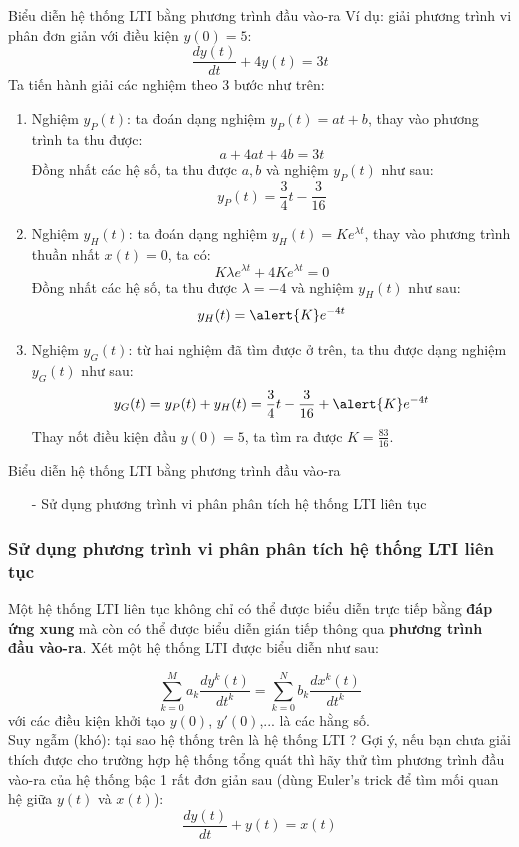 \documentclass[8pt]{beamer}
\begin{document}
\begin{frame}{Biểu diễn hệ thống LTI bằng phương trình đầu vào-ra}
Ví dụ: giải phương trình vi phân đơn giản với điều kiện $y(0)=5$:
$$\frac{dy(t)}{dt}+4y(t)=3t$$
Ta tiến hành giải các nghiệm theo 3 bước như trên:
\begin{enumerate}
	\item Nghiệm $y_{P}(t)$: ta đoán dạng nghiệm $y_{P}(t)=at+b$, thay vào phương trình ta thu được: $$a+4at+4b=3t$$
Đồng nhất các hệ số, ta thu được $a,b$ và nghiệm $y_{P}(t)$ như sau:
$$y_{P}(t)=\frac{3}{4}t-\frac{3}{16}$$
\item Nghiệm $y_{H}(t)$: ta đoán dạng nghiệm $y_{H}(t)=Ke^{\lambda t}$, thay vào phương trình thuần nhất $x(t)=0$, ta có:
	$$K\lambda e^{\lambda t}+4K e^{\lambda t}=0$$
Đồng nhất các hệ số, ta thu được $\lambda=-4$ và nghiệm $y_{H}(t)$ như sau:
$$y_{H}(t)=\alert{K}e^{-4t}$$
\item Nghiệm $y_{G}(t)$: từ hai nghiệm đã tìm được ở trên, ta thu được dạng nghiệm $y_{G}(t)$ như sau:
	$$y_{G}(t)=y_{P}(t)+y_{H}(t)=\frac{3}{4}t-\frac{3}{16}+\alert{K}e^{-4t}$$
	Thay nốt điều kiện đầu $y(0)=5$, ta tìm ra được $K=\frac{83}{16}$. 
\end{enumerate}
\end{frame}
\begin{frame}{Biểu diễn hệ thống LTI bằng phương trình đầu vào-ra}
\begin{itemize}
	\item[-] Sử dụng phương trình vi phân phân tích hệ thống LTI liên tục  
\end{itemize}
\subsubsection{Sử dụng phương trình vi phân phân tích hệ thống LTI liên tục}

Một hệ thống LTI liên tục không chỉ có thể được biểu diễn trực tiếp bằng \textbf{đáp ứng xung} mà còn có thể được biểu diễn gián tiếp thông qua \textbf{phương trình đầu vào-ra}. Xét một hệ thống LTI được biểu diễn như sau:

$$\sum_{k=0}^{M}a_{k}\frac{dy^k(t)}{dt^k}=\sum_{k=0}^{N}b_{k}\frac{dx^k(t)}{dt^k}$$
với các điều kiện khởi tạo $y(0)$, $y'(0)$,... là các hằng số.
\\Suy ngẫm (khó): tại sao hệ thống trên là hệ thống LTI ? Gợi ý, nếu bạn chưa giải thích được cho trường hợp hệ thống tổng quát thì hãy thử tìm phương trình đầu vào-ra của hệ thống bậc 1 rất đơn giản sau (dùng Euler's trick để tìm mối quan hệ giữa $y(t)$ và $x(t)$):
$$\frac{dy(t)}{dt}+y(t)=x(t)$$
\end{frame}
\end{document}
